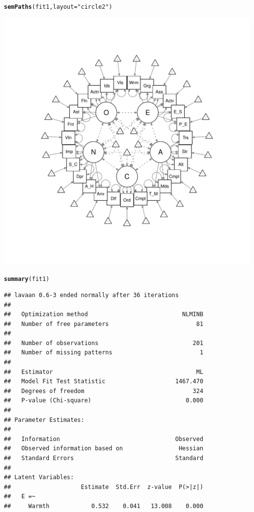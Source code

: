 \documentclass{article}\usepackage[]{graphicx}\usepackage[]{color}
\makeatletter
\def\maxwidth{ %
  \ifdim\Gin@nat@width>\linewidth
    \linewidth
  \else
    \Gin@nat@width
  \fi
}
\newcommand{\hlstr}[1]{\textcolor[rgb]{0.192,0.494,0.8}{#1}}%
\newcommand{\hlstd}[1]{\textcolor[rgb]{0.345,0.345,0.345}{#1}}%
\newcommand{\hlkwc}[1]{\textcolor[rgb]{0.333,0.667,0.333}{#1}}%
\newcommand{\hlkwd}[1]{\textcolor[rgb]{0.737,0.353,0.396}{\textbf{#1}}}%
\newenvironment{kframe}{%
 \def\at@end@of@kframe{}%
 \ifinner\ifhmode%
  \def\at@end@of@kframe{\end{minipage}}%
  \begin{minipage}{\columnwidth}%
 \fi\fi%
 \def\FrameCommand##1{\hskip\@totalleftmargin \hskip-\fboxsep
 \colorbox{shadecolor}{##1}\hskip-\fboxsep
     \hskip-\linewidth \hskip-\@totalleftmargin \hskip\columnwidth}%
 \MakeFramed {\advance\hsize-\width
   \@totalleftmargin\z@ \linewidth\hsize
   \@setminipage}}%
 {\par\unskip\endMakeFramed%
 \at@end@of@kframe}
\newenvironment{knitrout}{}{} %
\makeatother
\begin{document}
\begin{knitrout}
\begin{kframe}
\begin{alltt}
\hlkwd{semPaths}\hlstd{(fit1,} \hlkwc{layout} \hlstd{=} \hlstr{"circle2"}\hlstd{)}
\end{alltt}
\end{kframe}
\includegraphics[width=\maxwidth]{figure/unnamed-chunk-5-1} 
\begin{kframe}\begin{alltt}
\hlkwd{summary}\hlstd{(fit1)}
\end{alltt}
\begin{verbatim}
## lavaan 0.6-3 ended normally after 36 iterations
## 
##   Optimization method                           NLMINB
##   Number of free parameters                         81
## 
##   Number of observations                           201
##   Number of missing patterns                         1
## 
##   Estimator                                         ML
##   Model Fit Test Statistic                    1467.470
##   Degrees of freedom                               324
##   P-value (Chi-square)                           0.000
## 
## Parameter Estimates:
## 
##   Information                                 Observed
##   Observed information based on                Hessian
##   Standard Errors                             Standard
## 
## Latent Variables:
##                    Estimate  Std.Err  z-value  P(>|z|)
##   E =~                                                
##     Warmth            0.532    0.041   13.008    0.000

\end{verbatim}
\end{kframe}
\end{knitrout}
\end{document}
